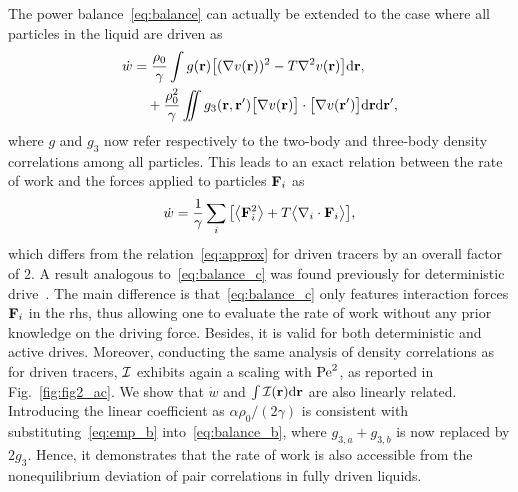 \documentclass[superscriptaddress, twocolumn, prx, longbibliography, nofootinbib]{revtex4-1}
\newcommand{\dd}{\text{d}}
\begin{document}
The power balance~\eqref{eq:balance} can actually be extended to the case where all particles in the liquid are driven as
\begin{equation}\label{eq:balance_b}
	\begin{aligned}
		\dot w &= \frac{\rho_0}{\gamma} \int g({\bf r}) \big[(\nabla v({\bf r}))^2 - T \nabla^2 v({\bf r})\big] \dd{\bf r} ,
		\\
		&\quad + \frac{\rho_0^2}{\gamma} \iint g_3({\bf r}, {\bf r}') \big[\nabla v({\bf r})\big] \cdot \big[\nabla v({\bf r}')\big] \dd{\bf r} \dd{\bf r}' ,
	\end{aligned}
\end{equation}
where $g$ and $g_3$ now refer respectively to the two-body and three-body density correlations among all particles. This leads to an exact relation between the rate of work and the forces applied to particles ${\bf F}_i$ as
\begin{equation}\label{eq:balance_c}
	\dot w = \frac{1}{\gamma}\sum_i \big[ \big\langle{\bf F}_i^2\big\rangle + T \big\langle\nabla_i\cdot{\bf F}_i\big\rangle \big] ,
\end{equation}
which differs from the relation~\eqref{eq:approx} for driven tracers by an overall factor of $2$. A result analogous to~\eqref{eq:balance_c} was found previously for deterministic drive~\cite{Maes2010, Maes2015}. The main difference is that~\eqref{eq:balance_c} only features interaction forces ${\bf F}_i$ in the rhs, thus allowing one to evaluate the rate of work without any prior knowledge on the driving force. Besides, it is valid for both deterministic and active drives. Moreover, conducting the same analysis of density correlations as for driven tracers, ${\cal I}$ exhibits again a scaling with ${\rm Pe}^2$, as reported in Fig.~\ref{fig:fig2_ac}. We show that $\dot w$ and $\int{\cal I}({\bf r}){\rm d}{\bf r}$ are also linearly related. Introducing the linear coefficient as $\alpha\rho_0/(2\gamma)$ is consistent with substituting~\eqref{eq:emp_b} into~\eqref{eq:balance_b}, where $g_{3,a}+g_{3,b}$ is now replaced by $2g_3$. Hence, it demonstrates that the rate of work is also accessible from the nonequilibrium deviation of pair correlations in fully driven liquids. %
\end{document}
